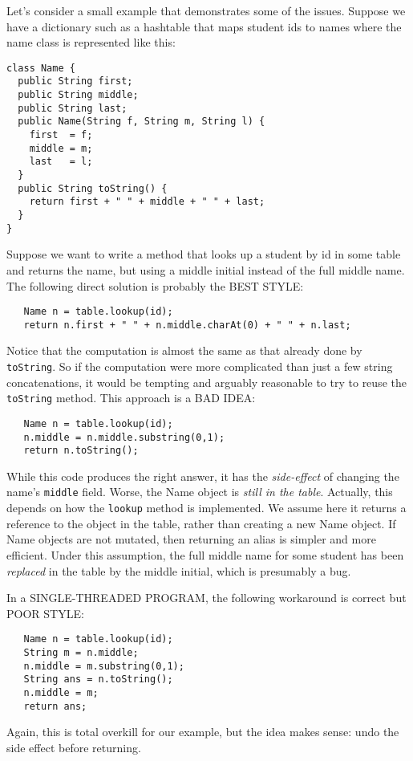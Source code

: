 \documentclass[10pt]{article}
\begin{document}
Let's consider a small example that demonstrates some of the issues.
Suppose we have a dictionary such as a hashtable that maps student ids
to names where the name class is represented like this:
\begin{verbatim}
class Name {
  public String first;
  public String middle;
  public String last;
  public Name(String f, String m, String l) {
    first  = f;
    middle = m;
    last   = l;
  }
  public String toString() {
    return first + " " + middle + " " + last;
  }
}
\end{verbatim}
Suppose we want to write a method that looks up a student by id in 
some table and returns the name, but using a middle initial instead of
the full middle name.  The following direct solution is probably the
BEST STYLE:
\begin{verbatim}
   Name n = table.lookup(id);
   return n.first + " " + n.middle.charAt(0) + " " + n.last;
\end{verbatim}
Notice that the computation is almost the same as that already done by
{\tt toString}.  So if the computation were more complicated than just
a few string concatenations, it would be tempting and arguably
reasonable to try to reuse the {\tt toString} method.  This approach
is a BAD IDEA:
\begin{verbatim}
   Name n = table.lookup(id);
   n.middle = n.middle.substring(0,1);
   return n.toString();
\end{verbatim}
While this code produces the right answer, it has the
\emph{side-effect} of changing the name's {\tt middle} field.  Worse,
the Name object is \emph{still in the table}.  Actually, this depends on how the
{\tt lookup} method is implemented.  We assume here it returns a
reference to the object in the table, rather than creating a new 
  Name object.  If Name objects are not mutated, then returning an
  alias is simpler and more efficient.  Under this assumption, the
  full middle name for some student has been \emph{replaced} in the
  table by the middle initial, which is presumably a bug.

In a SINGLE-THREADED PROGRAM, the following workaround is correct but
POOR STYLE:
\begin{verbatim}
   Name n = table.lookup(id);
   String m = n.middle;
   n.middle = m.substring(0,1);
   String ans = n.toString();
   n.middle = m;
   return ans;
\end{verbatim}
Again, this is total overkill for our example, but the idea makes
sense: undo the side effect before returning.
\end{document}
